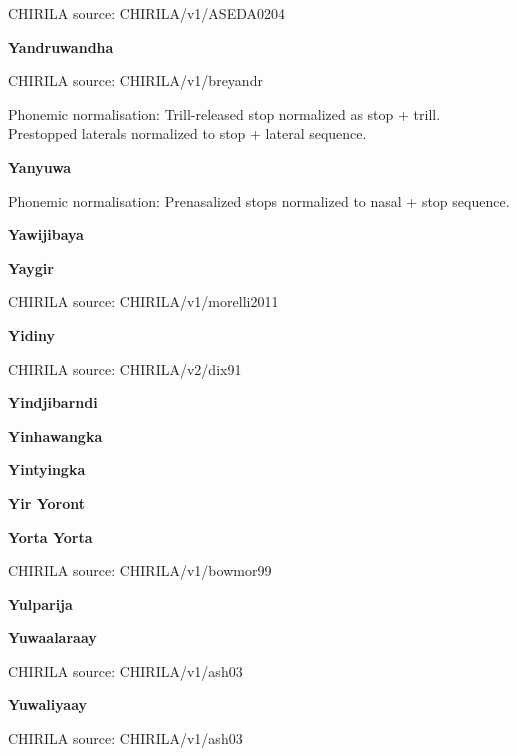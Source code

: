 CHIRILA source: CHIRILA/v1/ASEDA0204


\textbf{Yandruwandha}

CHIRILA source: CHIRILA/v1/breyandr


Phonemic normalisation: Trill-released stop normalized as stop + trill.
Prestopped laterals normalized to stop + lateral sequence.

\textbf{Yanyuwa}


Phonemic normalisation: Prenasalized stops normalized to nasal + stop
sequence.

\textbf{Yawijibaya}


\textbf{Yaygir}

CHIRILA source: CHIRILA/v1/morelli2011


\textbf{Yidiny}

CHIRILA source: CHIRILA/v2/dix91


\textbf{Yindjibarndi}


\textbf{Yinhawangka}


\textbf{Yintyingka}


\textbf{Yir Yoront}


\textbf{Yorta Yorta}

CHIRILA source: CHIRILA/v1/bowmor99


\newpage


\textbf{Yulparija}


\textbf{Yuwaalaraay}

CHIRILA source: CHIRILA/v1/ash03


\textbf{Yuwaliyaay}

CHIRILA source: CHIRILA/v1/ash03

